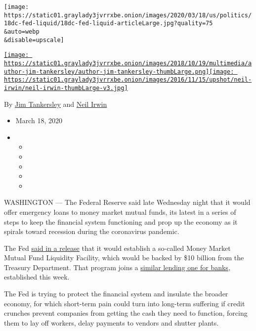 \texttt{[image: https://static01.graylady3jvrrxbe.onion/images/2020/03/18/us/politics/18dc-fed-liquid/18dc-fed-liquid-articleLarge.jpg?quality=75\\\&auto=webp\\\&disable=upscale]}

\href{https://www.nytimes3xbfgragh.onion/by/jim-tankersley}{\texttt{[image: https://static01.graylady3jvrrxbe.onion/images/2018/10/19/multimedia/author-jim-tankersley/author-jim-tankersley-thumbLarge.png]}}\href{https://www.nytimes3xbfgragh.onion/by/neil-irwin}{\texttt{[image: https://static01.graylady3jvrrxbe.onion/images/2016/11/15/upshot/neil-irwin/neil-irwin-thumbLarge-v3.jpg]}}

By \href{https://www.nytimes3xbfgragh.onion/by/jim-tankersley}{Jim
Tankersley} and
\href{https://www.nytimes3xbfgragh.onion/by/neil-irwin}{Neil Irwin}

\begin{itemize}
\item
  March 18, 2020
\item
  \begin{itemize}
  \item
  \item
  \item
  \item
  \item
  \end{itemize}
\end{itemize}

WASHINGTON --- The Federal Reserve said late Wednesday night that it
would offer emergency loans to money market mutual funds, its latest in
a series of steps to keep the financial system functioning and prop up
the economy as it spirals toward recession during the coronavirus
pandemic.

The Fed
\href{https://www.federalreserve.gov/newsevents/pressreleases/monetary20200318a.htm}{said
in a release} that it would establish a so-called Money Market Mutual
Fund Liquidity Facility, which would be backed by \$10 billion from the
Treasury Department. That program joins a
\href{https://www.nytimes3xbfgragh.onion/2020/03/17/business/economy/federal-reserve-coronavirus.html}{similar
lending one for banks}, established this week.

The Fed is trying to protect the financial system and insulate the
broader economy, for which short-term pain could turn into long-term
suffering if credit crunches prevent companies from getting the cash
they need to function, forcing them to lay off workers, delay payments
to vendors and shutter plants.

